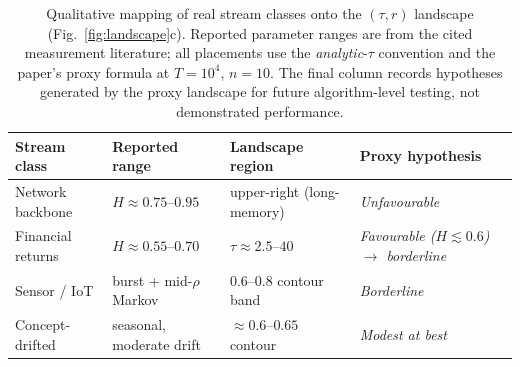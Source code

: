 \documentclass[sensors,article,submit,pdftex,moreauthors]{Definitions/mdpi}
\providecommand{\DIFadd}[1]{{\protect\color{blue}#1}} %
\providecommand{\DIFdel}[1]{} %
\providecommand{\DIFaddFL}[1]{\DIFadd{#1}} %
\providecommand{\DIFdelFL}[1]{\DIFdel{#1}} %
\providecommand{\DIFaddbeginFL}{} %
\providecommand{\DIFaddendFL}{} %
\providecommand{\DIFdelbeginFL}{} %
\providecommand{\DIFdelendFL}{} %
\begin{document}
\begin{table}[t]
\centering
\caption{Qualitative mapping of real stream classes onto the $(\tau, r)$ landscape (Fig.~\ref{fig:landscape}c). Reported parameter ranges are from the cited measurement literature; \DIFaddbeginFL \DIFaddFL{all placements use the }\emph{\DIFaddFL{analytic}}\DIFaddFL{-$\tau$ convention and the paper's }\DIFaddendFL proxy \DIFdelbeginFL \DIFdelFL{predictions are qualitative}\DIFdelendFL \DIFaddbeginFL \DIFaddFL{formula at $T = 10^{4}$, $n = 10$}\DIFaddendFL . \DIFaddbeginFL \DIFaddFL{The final column records hypotheses generated by the proxy landscape for future algorithm-level testing, not demonstrated performance.}\DIFaddendFL }
\label{tab:stream_classes}
\DIFdelbeginFL %
\DIFdelendFL \DIFaddbeginFL \begin{tabularx}{\textwidth}{@{}lp{2.9cm}XX@{}}
\toprule
Stream class & Reported range & Landscape region & Proxy hypothesis \\
\midrule
Network backbone & $H \approx 0.75$--$0.95$ & upper-right (long-memory) & \emph{Unfavourable} \\
Financial returns & $H \approx 0.55$--$0.70$ & $\tau \approx 2.5$--$40$ & \emph{Favourable ($H {\lesssim} 0.6$) $\to$ borderline} \\
Sensor / IoT & burst + mid-$\rho$ Markov & $0.6$--$0.8$ contour band & \emph{Borderline} \\
Concept-drifted & seasonal, moderate drift & ${\approx}0.6$--$0.65$ contour & \emph{Modest at best} \\
\bottomrule
\end{tabularx}
\DIFaddendFL \end{table}
\end{document}

